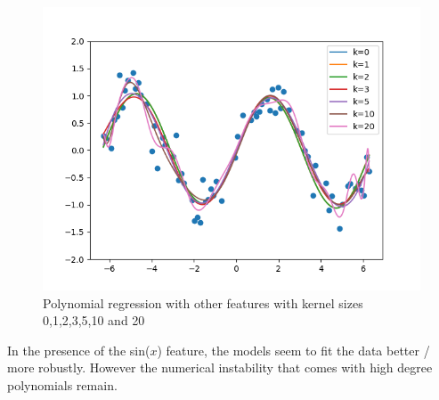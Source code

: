 \begin{answer}
\begin{figure}[H]
  \centering
  \vspace{-2mm}
  \includegraphics[width=0.65\linewidth]{../src/featuremaps/large-sine.png}
  \centering
\caption{Polynomial regression with other features with kernel sizes 0,1,2,3,5,10 and 20}
\end{figure}

In the presence of the sin($x$) feature, the models seem to fit the data better / more robustly. However the numerical instability that comes with high degree polynomials remain.

\end{answer}
